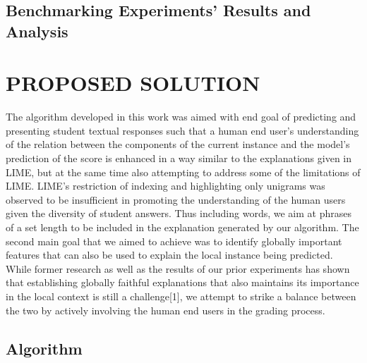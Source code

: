 \documentclass[letterpaper, 10 pt, conference]{ieeeconf}  %
\begin{document}
\subsection{Benchmarking Experiments' Results and Analysis}


\section{PROPOSED SOLUTION}

The algorithm developed in this work was aimed with end goal of predicting and presenting student textual responses such that a human end user's understanding of the relation between the components of the current instance and the model's prediction of the score is enhanced in a way similar to the explanations given in LIME, but at the same time also attempting to address some of the limitations of LIME. LIME's restriction of indexing and highlighting only unigrams was observed to be insufficient in promoting the understanding of the human users given the diversity of student answers. Thus including words, we aim at phrases of a set length to be included  in the explanation generated by our algorithm. The second main goal that we aimed to achieve was to identify globally important features that can also be used to explain the local instance being predicted. While former research as well as the results of our prior experiments has shown that establishing globally faithful explanations that also maintains its importance in the local context is still a challenge[1], we attempt to strike a balance between the two by actively involving the human end users in the grading process.

\subsection{Algorithm}
\end{document}
